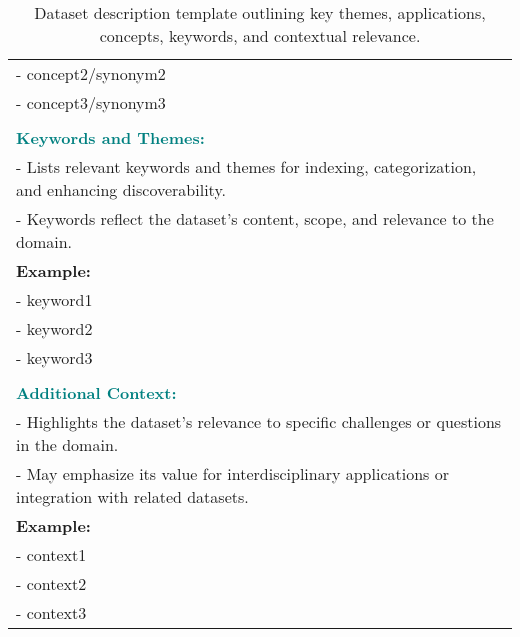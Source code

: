 \begin{table*}
\begin{tabular}{p{14cm}}
    - concept2/synonym2 \\
    - concept3/synonym3 \\
    \\
    \textcolor{teal}{\textbf{Keywords and Themes:}} \\
    - Lists relevant keywords and themes for indexing, categorization, and enhancing discoverability. \\
    - Keywords reflect the dataset's content, scope, and relevance to the domain. \\
    \textbf{Example:} \\
    - keyword1 \\
    - keyword2 \\
    - keyword3 \\
    \\
    \textcolor{teal}{\textbf{Additional Context:}} \\
    - Highlights the dataset's relevance to specific challenges or questions in the domain. \\
    - May emphasize its value for interdisciplinary applications or integration with related datasets. \\
    \textbf{Example:} \\
    - context1 \\
    - context2 \\
    - context3 \\
    \bottomrule
    \end{tabular}
    \caption{Dataset description template outlining key themes, applications, concepts, keywords, and contextual relevance.}
    \label{tab:template_sfd}
\end{table*}
